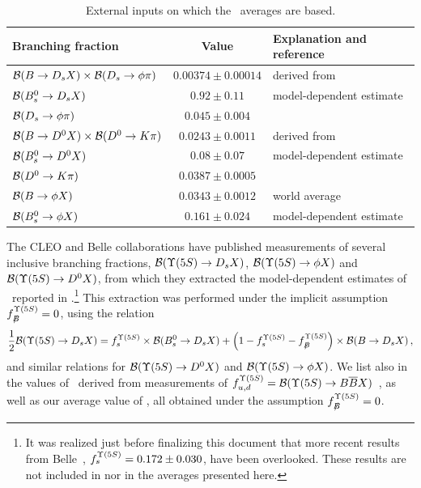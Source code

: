 \begin{table}
\caption{External inputs on which the \fsfive\ averages are based.}
\begin{center}
\begin{tabular}{lcl}
\hline
Branching fraction   & Value     & Explanation and reference \\
\hline
${\cal B}(B\to D_s X)\times {\cal B}(D_s \to \phi\pi)$ & 
$0.00374\pm 0.00014$ & derived from~\cite{PDG_2012} \\
${\cal B}(B^0_s \to D_s X)$ & 
$0.92\pm0.11$ & model-dependent estimate~\cite{Artuso:2005xw} \\
${\cal B}(D_s \to \phi\pi)$ & 
$0.045\pm0.004$ & \cite{PDG_2012} \\
${\cal B}(B\to D^0 X)\times {\cal B}(D^0 \to K\pi)$ & 
$0.0243\pm0.0011$ & derived from~\cite{PDG_2012} \\
${\cal B}(B^0_s \to D^0 X)$ & 
$0.08\pm0.07$ & model-dependent estimate~\cite{Drutskoy:2006fg,Artuso:2005xw} \\
${\cal B}(D^0 \to K\pi)$ & 
$0.0387\pm0.0005$ & \cite{PDG_2012} \\
${\cal B}(B \to \phi X)$ & 
$0.0343\pm0.0012$ & world average~\cite{PDG_2012,Huang:2006em_mod} \\
${\cal B}(B^0_s \to \phi X)$ &
$0.161\pm0.024$ & model-dependent estimate~\cite{Huang:2006em_mod} \\
\hline
\end{tabular}
\end{center}
\end{table}

The CLEO and Belle collaborations have published %
measurements of several inclusive \Upsfive branching fractions, 
${\cal B}(\Upsilon(5S)\to D_s X)$, 
${\cal B}(\Upsilon(5S)\to \phi X)$ and 
${\cal B}(\Upsilon(5S)\to D^0 X)$, %
from which they extracted the
model-dependent estimates of \fsfive\
reported in .\footnote{%
  \label{foot:life_mix:Esen:2012yz_mod}
  It was realized just before finalizing this document that
  more recent results from Belle~\cite{Esen:2012yz}, 
  $f^{\Upsilon(5S)}_{s} = 0.172 \pm 0.030$, have been overlooked. These results are 
  not included in \Table{fsFiveS} nor in the averages presented here. 
} %
This extraction was performed 
under the implicit assumption  
$f^{\Upsilon(5S)}_{B\!\!\!\!/}=0$, using the relation 
\begin{equation}
\frac12{\cal B}(\Upsfive\to D_s X)=\fsfive\times{\cal B}(B_s^0\to D_s X) + 
\left(1-\fsfive-\fnBfive\right)\times{\cal B}(B\to D_s X) \,,
\labe{Ds_correct}
\end{equation}
and similar relations for
${\cal B}(\Upsilon(5S)\to D^0 X)$ and ${\cal B}(\Upsilon(5S)\to \phi X)$.
We list also in  
the values of \fsfive\ derived from measurements of
$\fudfive={\cal B}(\Upsfive\to B\bar BX)$~\cite{Huang:2006em_mod,Drutskoy:2010an}, as well as our average value of  \fsfive,
all obtained under the assumption $f^{\Upsilon(5S)}_{B\!\!\!\!/}=0$.

